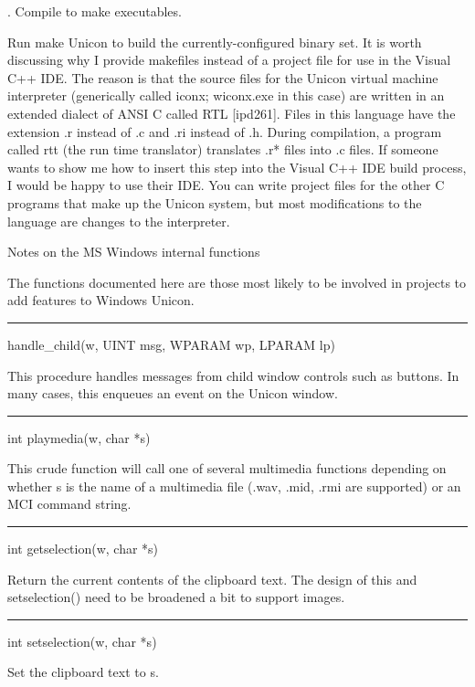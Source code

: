 {. Compile to make executables.}


Run {\textquotedbl}make Unicon{\textquotedbl} to build the
currently-configured binary set. It is worth discussing why I provide
makefiles instead of a project file for use in the Visual C++ IDE.
The reason is that the source files for the Unicon virtual machine
interpreter (generically called iconx; wiconx.exe in this case) are
written in an extended dialect of ANSI C called RTL [ipd261]. Files in
this language have the extension .r instead of .c and .ri instead of
.h. During compilation, a program called rtt (the run time translator)
translates .r* files into .c files. If someone wants to show me how to
insert this step into the Visual C++ IDE build process, I would be
happy to use their IDE. You can write project files for the other C
programs that make up the Unicon system, but most modifications to the
language are changes to the interpreter.

{\sffamily
Notes on the MS Windows internal functions}


The functions documented here are those most likely to be involved in
projects to add features to Windows Unicon.

{\sffamily\bfseries
\bigskip\hrule\vspace{0.1cm}
\noindent
handle\_child(w, UINT msg, WPARAM wp, LPARAM lp)}


This procedure handles messages from child window controls such as
buttons. In many cases, this enqueues an event on the Unicon window.


\bigskip\hrule\vspace{0.1cm}
\noindent
int playmedia(w, char *s)


This crude function will call one of several multimedia functions
depending on whether s is the name of a multimedia file (.wav, .mid,
.rmi are supported) or an MCI command string.


\bigskip\hrule\vspace{0.1cm}
\noindent
int getselection(w, char *s)


Return the current contents of the clipboard text. The design of this
and \textsf{setselection()} need to be broadened a bit to support
images.


\bigskip\hrule\vspace{0.1cm}
\noindent
int setselection(w, char *s)


Set the clipboard text to \textsf{s}.

